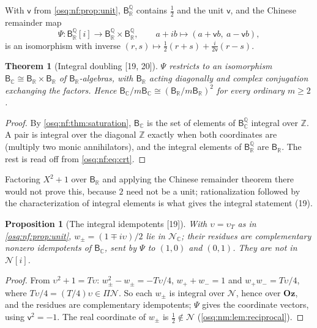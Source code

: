 \documentclass[11pt,letterpaper]{article}
\numberwithin{equation}{section}
\newtheorem{theorem}{Theorem}[section]
\newtheorem{proposition}[proposition]{Proposition}
\theoremstyle{definition}
\theoremstyle{remark}
\theoremstyle{plain}
\newcommand{\Oz}{\mathbf{Oz}}
\newcommand{\Z}{\mathbb Z}
\newcommand{\Q}{\mathbb Q}
\newcommand{\R}{\mathbb R}
\newcommand{\C}{\mathbb C}
\newcommand{\NN}{\mathcal N}         %
\newcommand{\src}[1]{\textup{\textsf{[#1]}}}
\begin{document}
With $\mathsf v$ from \cref{osq:nf:prop:unit}, $\mathsf B^\Q_\R$ contains $\frac12$ and the unit $\mathsf v$, and the Chinese remainder map
\begin{equation}\label{osq:nf:eq:crt}
 \Psi:\mathsf B^\Q_\R[i]\to\mathsf B^\Q_\R\times\mathsf B^\Q_\R,\qquad a+ib\mapsto(a+\mathsf vb,\ a-\mathsf vb),
\end{equation}
is an isomorphism with inverse $(r,s)\mapsto\frac12(r+s)+\frac i{2\mathsf v}(r-s)$.

\begin{theorem}[Integral doubling \src{19, 20}]\label{osq:nf:thm:doubling}
$\Psi$ restricts to an isomorphism $\mathsf B_\C\cong\mathsf B_\R\times\mathsf B_\R$ of $\mathsf B_\R$-algebras, with $\mathsf B_\R$ acting diagonally and
complex conjugation exchanging the factors. Hence $\mathsf B_\C/m\mathsf B_\C\cong(\mathsf B_\R/m\mathsf B_\R)^2$ for every ordinary $m\ge2$.
\end{theorem}
\begin{proof}
By \cref{osq:nf:thm:saturation}, $\mathsf B_\C$ is the set of elements of $\mathsf B^\Q_\C$ integral over $\Z$. A pair is integral over the diagonal $\Z$
exactly when both coordinates are (multiply two monic annihilators), and the integral elements of $\mathsf B^\Q_\R$ are $\mathsf B_\R$. The rest is read
off from \eqref{osq:nf:eq:crt}.
\end{proof}

Factoring $X^2+1$ over $\mathsf B_\R$ and applying the Chinese remainder theorem there would not prove this, because $2$ need not be a unit;
rationalization followed by the characterization of integral elements is what gives the integral statement (19).

\begin{proposition}[The integral idempotents \src{19}]\label{osq:nf:prop:idempotents}
With $\upsilon=\upsilon_T$ as in \cref{osq:nf:prop:unit}, $w_\pm=(1\mp i\upsilon)/2$ lie in $\NN_\C$; their residues are complementary nonzero
idempotents of $\mathsf B_\C$, sent by $\Psi$ to $(1,0)$ and $(0,1)$. They are not in $\NN[i]$.
\end{proposition}
\begin{proof}
From $\upsilon^2+1=T\upsilon$: $w_\pm^2-w_\pm=-T\upsilon/4$, $w_++w_-=1$ and $w_+w_-=T\upsilon/4$, where $T\upsilon/4=(T/4)\upsilon\in\Pi\NN$. So each
$w_\pm$ is integral over $\NN$, hence over $\Oz$, and the residues are complementary idempotents; $\Psi$ gives the coordinate vectors, using
$\mathsf v^2=-1$. The real coordinate of $w_\pm$ is $\frac12\notin\NN$ (\cref{osq:nm:lem:reciprocal}).
\end{proof}
\end{document}
